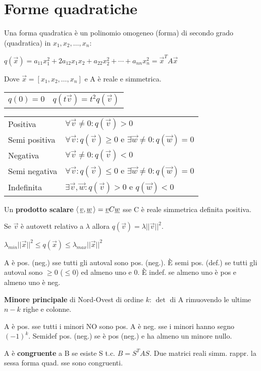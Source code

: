\section{Forme quadratiche}

Una forma quadratica è un polinomio omogeneo (forma) di secondo grado (quadratica) in $x_1, x_2, \dots, x_n$:

$q(\vec{x}) = a_{11}x_1^2+2a_{12}x_1x_2+a_{22}x_2^2+\cdots+a_{nn}x_n^2 = \vec{x}^TA\vec{x}$

Dove $\vec{x} = [x_1, x_2, \dots, x_n]$ e A è reale e simmetrica.

\begin{tabular}{ll}
	$q(0)=0$ & $q(t\vec{v}) = t^2q(\vec{v})$
\end{tabular}

\begin{tabular}{ll}
	Positiva & $\forall \vec{v} \ne 0: q(\vec{v}) > 0$ \\
	Semi positiva & $\forall \vec{v}: q(\vec{v}) \ge 0$ e $\exists \vec{w} \ne 0 : q(\vec{w}) = 0$ \\
	Negativa & $\forall \vec{v} \ne 0: q(\vec{v}) < 0$ \\
	Semi negativa & $\forall \vec{v}: q(\vec{v}) \le 0$ e $\exists \vec{w} \ne 0 : q(\vec{w}) = 0$ \\
	Indefinita & $\exists \vec{v}, \vec{w}: q(\vec{v}) > 0$ e $q(\vec{w}) < 0$
\end{tabular}

Un \textbf{prodotto scalare} $\langle\,\underline{v},\underline{w}\,\rangle = \underline{v}C\underline{w}$ sse C è reale simmetrica definita positiva.

Se $\vec{v}$ è autovett relativo a $\lambda$ allora $q(\vec{v}) = \lambda||\vec{v}||^2$.

$\lambda_{min}||\vec{x}||^2 \le q(\vec{x}) \le \lambda_{max}||\vec{x}||^2$

A è pos. (neg.) sse tutti gli autoval sono pos. (neg.). È semi pos. (def.) se tutti gli autoval sono $\ge 0$ ($\le 0$) ed almeno uno e 0. È indef. se almeno uno è pos e almeno uno è neg.

\textbf{Minore principale} di Nord-Ovest di ordine $k$: $\det$ di A rimuovendo le ultime $n-k$ righe e colonne.

A è pos. sse tutti i minori NO sono pos. A è neg. sse i minori hanno segno $(-1)^k$. Semidef pos. (neg.) se è pos (neg.) e ha almeno un minore nullo.

A è \textbf{congruente} a B se esiste S t.c. $B=S^TAS$. Due matrici reali simm. rappr. la sessa forma quad. sse sono congruenti.

